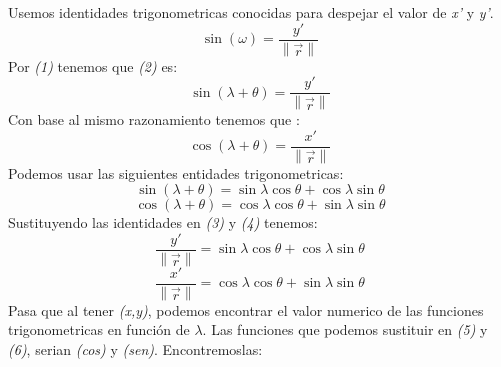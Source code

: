\documentclass{article}
\begin{document}
Usemos identidades trigonometricas conocidas para despejar el valor de \textit{x'} y \textit{y'}.
\begin{equation}
    \sin(\omega)=\frac{y'}{ \left \| \overrightarrow{r} \right \|}
\end{equation}
Por \textit{(1)} tenemos que \textit{(2)} es:
\begin{equation}
    \sin(\lambda + \theta)=\frac{y'}{ \left \| \overrightarrow{r} \right \|}
\end{equation}
Con base al mismo razonamiento tenemos que :
\begin{equation}
    \cos(\lambda + \theta)=\frac{x'}{ \left \| \overrightarrow{r} \right \|}
\end{equation}
Podemos usar las siguientes entidades trigonometricas:
\setcounter{equation}{0}
\begin{equation}
    \sin(\lambda + \theta)= \sin{\lambda}\cos{\theta}+\cos{\lambda}\sin{\theta}
\end{equation}
\begin{equation}
    \cos(\lambda + \theta)= \cos{\lambda}\cos{\theta}+\sin{\lambda}\sin{\theta}
\end{equation}
Sustituyendo las identidades en \textit{(3)} y \textit{(4)} tenemos:
\setcounter{equation}{4}
\begin{equation}
   \frac{y'}{ \left \| \overrightarrow{r} \right \|} =  \sin{\lambda}\cos{\theta}+\cos{\lambda}\sin{\theta}
\end{equation}
\begin{equation}
   \frac{x'}{ \left \| \overrightarrow{r} \right \|} =  \cos{\lambda}\cos{\theta}+\sin{\lambda}\sin{\theta}
\end{equation}
Pasa que al tener \textit{(x,y)}, podemos encontrar el valor numerico de las funciones trigonometricas en función de \begin{math}\lambda\end{math}. Las funciones que podemos sustituir en \textit{(5)} y \textit{(6)}, serian \textit{(cos)} y \textit{(sen)}. Encontremoslas: 
\end{document}
